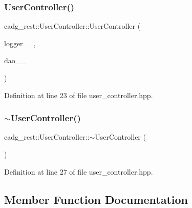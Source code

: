 \subsubsection{\texorpdfstring{UserController()}{UserController()}}
{\footnotesize\ttfamily cadg\+\_\+rest\+::\+User\+Controller\+::\+User\+Controller (\begin{DoxyParamCaption}\item[{\mbox{\hyperlink{classcadg__rest_1_1_logger_interface}{Logger\+Interface}} \&}]{logger\+\_\+\+\_\+,  }\item[{\mbox{\hyperlink{classcadg__rest_1_1_data_access_interface}{Data\+Access\+Interface}} \&}]{dao\+\_\+\+\_\+ }\end{DoxyParamCaption})\hspace{0.3cm}{\ttfamily [inline]}}



Definition at line 23 of file user\+\_\+controller.\+hpp.

\mbox{\label{classcadg__rest_1_1_user_controller_a50fe3192b76a765abdcda0f4a9cbc20b}} 
\subsubsection{\texorpdfstring{$\sim$UserController()}{~UserController()}}
{\footnotesize\ttfamily cadg\+\_\+rest\+::\+User\+Controller\+::$\sim$\+User\+Controller (\begin{DoxyParamCaption}{ }\end{DoxyParamCaption})\hspace{0.3cm}{\ttfamily [inline]}}



Definition at line 27 of file user\+\_\+controller.\+hpp.



\subsection{Member Function Documentation}
\mbox{\label{classcadg__rest_1_1_user_controller_a1d3d450422fabffd4ff66a9267834ea6}} 

